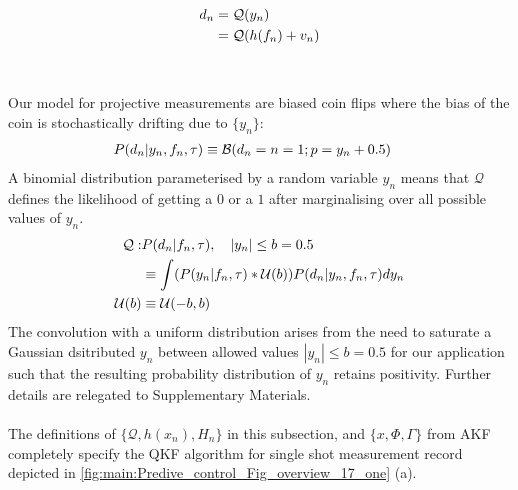 \begin{align}
d_n &= \mathcal{Q}(y_n)\\
&=  \mathcal{Q}(h(f_n) + v_n)
\end{align}
\\
\\ 
Our model for projective measurements are biased coin flips where the bias of the coin is stochastically drifting due to $\{ y_n\}$:
\begin{align}
P(d_n | y_n, f_{n}, \tau) & \equiv \mathcal{B}(d_n=n=1;p= y_n + 0.5 ) 
\end{align}
A binomial distribution parameterised by a random variable $y_n$ means that $\mathcal{Q}$ defines the likelihood of getting a $0$ or a $1$ after marginalising over all possible values of $y_n$.  
\begin{align}
\mathcal{Q}: & P(d_n | f_{n}, \tau), \quad |y_n| \leq b = 0.5\\
& \equiv  \int (P(y_n | f_{n}, \tau) * \mathcal{U}(b) ) P(d_n | y_n, f_{n}, \tau) dy_n \\
\mathcal{U}(b) & \equiv \mathcal{U}(-b, b)
\end{align}
The convolution with a uniform distribution arises from the need to saturate a Gaussian dsitributed  $y_n$ between allowed values $|y_n| \leq b = 0.5$ for our application such that the resulting probability distribution of $y_n$ retains positivity. Further details are relegated to Supplementary Materials. 
\\
\\
The definitions of $\{ \mathcal{Q}, h(x_n), H_n \}$ in this subsection, and $\{x, \Phi, \Gamma\}$ from AKF completely specify the QKF algorithm for single shot measurement record depicted in \cref{fig:main:Predive_control_Fig_overview_17_one} (a).  
\\
\\
